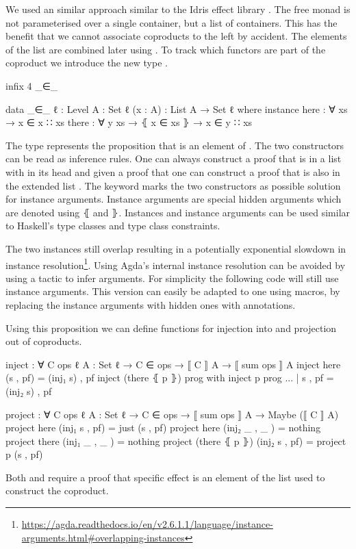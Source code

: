 We used an similar approach similar to the Idris effect library
\cite{DBLP:conf/icfp/Brady13}.
The free monad is not parameterised over a single container, but a list
 of containers.
This has the benefit that we cannot associate coproducts to the left by
accident.
The elements of the list are combined later using .
To track which functors are part of the coproduct we introduce the new type
.

\begin{code}[hide]
infix 4 _∈_
\end{code}
\begin{code}
data _∈_ {ℓ : Level} {A : Set ℓ} (x : A) : List A → Set ℓ where
  instance
    here   : ∀ {xs} → x ∈ x ∷ xs
    there  : ∀ {y xs} → ⦃ x ∈ xs ⦄ → x ∈ y ∷ xs
\end{code}
The type
\AgdaSpace{}\AgdaSpace{}
represents the proposition that  is an element of
.
The two constructors can be read as inference rules.
One can always construct a proof that  is in a list with
 in its head and given a proof that
\AgdaSpace{}\AgdaSpace{}
one can construct a proof that  is also in the extended list
\AgdaSpace{}\AgdaSpace{}.
The  keyword marks the two constructors as possible
solution for instance arguments.
Instance arguments are special hidden arguments which are denoted using
$\lBrace$ and $\rBrace$.
Instances and instance arguments can be used similar to Haskell's type classes
and type class constraints.

The two instances still overlap resulting in a potentially exponential slowdown
in instance resolution\footnote{\url{https://agda.readthedocs.io/en/v2.6.1.1/language/instance-arguments.html\#overlapping-instances}}.
Using Agda's internal instance resolution can be avoided by using a
tactic to infer  arguments.
For simplicity the following code will still use instance arguments.
This version can easily be adapted to one using macros, by replacing the
instance arguments with hidden ones with  annotations.

Using this proposition we can define functions for injection into and projection
out of coproducts.

\begin{code}
inject : ∀ {C ops ℓ} {A : Set ℓ} → C ∈ ops → ⟦ C ⟧ A → ⟦ sum ops ⟧ A
inject here           (s , pf)  = (inj₁ s) , pf
inject (there ⦃ p ⦄)  prog      with inject p prog
... | s , pf = (inj₂ s) , pf

project : ∀ {C ops ℓ} {A : Set ℓ} → C ∈ ops → ⟦ sum ops ⟧ A → Maybe (⟦ C ⟧ A)
project here           (inj₁ s , pf)  = just (s , pf)
project here           (inj₂ _ , _ )  = nothing
project there          (inj₁ _ , _ )  = nothing
project (there ⦃ p ⦄)  (inj₂ s , pf)  = project p (s , pf)
\end{code}
Both  and  require a proof that
specific effect is an element of the list used to construct the coproduct.

